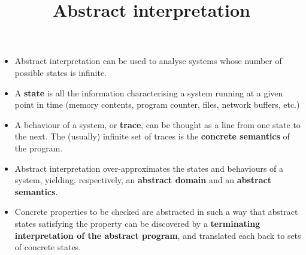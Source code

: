 \documentclass[wide]{slides}
\begin{document}
\begin{slide}
  \title{Abstract interpretation}

  \begin{itemize}

    \item Abstract interpretation can be used to analyse systems whose
      number of possible states is infinite.

    \item A \textbf{state} is all the information characterising a
      system running at a given point in time (memory contents,
      program counter, files, network buffers, etc.)

    \item A behaviour of a system, or \textbf{trace}, can be thought
      as a line from one state to the next. The (usually) infinite set
      of traces is the \textbf{concrete semantics} of the program.

    \item Abstract interpretation over\hyp{}approximates the states
      and behaviours of a system, yielding, respectively, an
      \textbf{abstract domain} and an \textbf{abstract semantics}.

    \item Concrete properties to be checked are abstracted in such a
      way that abstract states satisfying the property can be
      discovered by a \textbf{terminating interpretation of the
        abstract program}, and translated each back to sets of
      concrete states.

  \end{itemize}

\end{slide}
\end{document}
